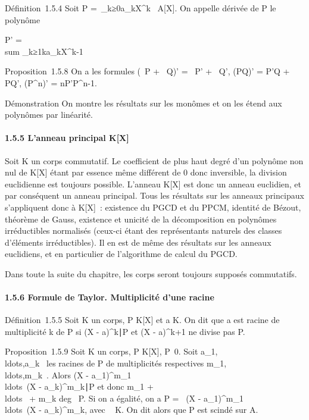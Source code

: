 Définition~1.5.4 Soit P =\
\sum  _k≥0a_kX^k~ \in
A[X]. On appelle dérivée de P le polynôme

P' = \\sum
_k≥1ka_kX^k-1

Proposition~1.5.8 On a les formules (\alpha~P + \beta~Q)' = \alpha~P' + \beta~Q', (PQ)' = P'Q
+ PQ', (P^n)' = nP'P^n-1.

Démonstration On montre les résultats sur les monômes et on les étend
aux polynômes par linéarité.

\paragraph{1.5.5 L'anneau principal K[X]}

Soit K un corps commutatif. Le coefficient de plus haut degré d'un
polynôme non nul de K[X] étant par essence même différent de 0 donc
inversible, la division euclidienne est toujours possible. L'anneau
K[X] est donc un anneau euclidien, et par conséquent un anneau
principal. Tous les résultats sur les anneaux principaux s'appliquent
donc à K[X]~: existence du PGCD et du PPCM, identité de Bézout,
théorème de Gauss, existence et unicité de la décomposition en polynômes
irréductibles normalisés (ceux-ci étant des représentants naturels des
classes d'éléments irréductibles). Il en est de même des résultats sur
les anneaux euclidiens, et en particulier de l'algorithme de calcul du
PGCD.

Dans toute la suite du chapitre, les corps seront toujours supposés
commutatifs.

\paragraph{1.5.6 Formule de Taylor. Multiplicité d'une racine}

Définition~1.5.5 Soit K un corps, P \in K[X] et a \in K. On dit que a
est racine de multiplicité k de P si (X -
a)^k∣P et (X - a)^k+1 ne
divise pas P.

Proposition~1.5.9 Soit K un corps, P \in K[X],
P\neq~0. Soit
a_1,\\ldots,a_k~
les racines de P de multiplicités respectives
m_1,\\ldots,m_k~.
Alors (X -
a_1)^m_1\\ldots~(X
- a_k)^m_k∣P et
donc m_1 +
\\ldots~ +
m_k \leq deg~ P. Si on a égalité, on a P
= \lambda~(X -
a_1)^m_1\\ldots~(X
- a_k)^m_k, avec \lambda~ \in K. On dit alors que P
est scindé sur A.

